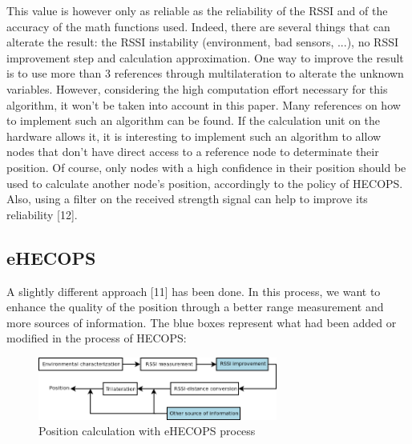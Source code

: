\documentclass[a4paper,10pt]{article}
\begin{document}
This value is however only as reliable as the reliability of the RSSI and of the accuracy of the math functions used. Indeed, there are several
things that can alterate the result: the RSSI instability (environment, bad sensors, ...), no RSSI improvement step and calculation approximation.
One way to improve the result is to use more than 3 references through multilateration to alterate the unknown variables. However, considering the
high computation effort necessary for this algorithm, it won't be taken into account in this paper. Many references on how to implement such
an algorithm can be found. If the calculation unit on the hardware allows it, it is interesting to implement such an algorithm to allow nodes that 
don't have direct access to a reference node to determinate their position. Of course, only nodes with a high confidence in their position should
be used to calculate another node's position, accordingly to the policy of HECOPS. Also, using a filter on the received strength signal can help 
to improve its reliability [12].

\subsection{eHECOPS}
A slightly different approach [11] has been done. In this process, we want to enhance the quality of the position through a better range measurement and more
sources of information.
The blue boxes represent what had been added or modified in the process of HECOPS:\\
\begin{figure}[H]
  \centering
 \includegraphics[width=0.7\textwidth]{process.png}
  \caption{Position calculation with eHECOPS process}
\end{figure}
\end{document}
